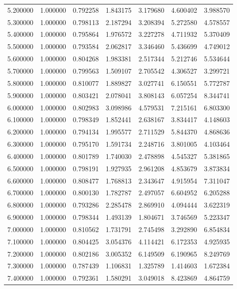 \begin{table}
\begin{tabular}{rrrrrrr}
5.200000 & 1.000000 & 0.792258 & 1.843175 & 3.179680 & 4.600402 & 3.988570 \\
5.300000 & 1.000000 & 0.798113 & 2.187294 & 3.208394 & 5.272580 & 4.578557 \\
5.400000 & 1.000000 & 0.795864 & 1.976572 & 3.227278 & 4.711932 & 5.370409 \\
5.500000 & 1.000000 & 0.793584 & 2.062817 & 3.346460 & 5.436699 & 4.749012 \\
5.600000 & 1.000000 & 0.804268 & 1.983381 & 2.517344 & 5.212746 & 5.534644 \\
5.700000 & 1.000000 & 0.799563 & 1.509107 & 2.705542 & 4.306527 & 3.299721 \\
5.800000 & 1.000000 & 0.810077 & 1.889827 & 3.027741 & 6.150551 & 5.772787 \\
5.900000 & 1.000000 & 0.803421 & 2.078041 & 3.808143 & 6.057254 & 8.344741 \\
6.000000 & 1.000000 & 0.802983 & 3.098986 & 4.579531 & 7.215161 & 6.803300 \\
6.100000 & 1.000000 & 0.798349 & 1.852441 & 2.638167 & 3.834417 & 4.148603 \\
6.200000 & 1.000000 & 0.794134 & 1.995577 & 2.711529 & 5.844370 & 4.868636 \\
6.300000 & 1.000000 & 0.795170 & 1.591734 & 2.248716 & 3.801005 & 4.103464 \\
6.400000 & 1.000000 & 0.801789 & 1.740030 & 2.478898 & 4.545327 & 5.381865 \\
6.500000 & 1.000000 & 0.798191 & 1.927935 & 2.961208 & 4.853679 & 3.873834 \\
6.600000 & 1.000000 & 0.808477 & 1.768813 & 2.343647 & 4.915954 & 7.311047 \\
6.700000 & 1.000000 & 0.800130 & 1.782787 & 2.497057 & 6.604952 & 6.205288 \\
6.800000 & 1.000000 & 0.793286 & 2.285478 & 2.869910 & 4.094444 & 3.622319 \\
6.900000 & 1.000000 & 0.798344 & 1.493139 & 1.804671 & 3.746569 & 5.223347 \\
7.000000 & 1.000000 & 0.810562 & 1.731791 & 2.745498 & 3.292890 & 6.854834 \\
7.100000 & 1.000000 & 0.804425 & 3.054376 & 4.114421 & 6.172353 & 4.925935 \\
7.200000 & 1.000000 & 0.802186 & 3.005352 & 6.149509 & 6.190965 & 8.249769 \\
7.300000 & 1.000000 & 0.787439 & 1.106831 & 1.325789 & 1.414603 & 1.672384 \\
7.400000 & 1.000000 & 0.792361 & 1.580291 & 3.049018 & 8.423869 & 4.864759 \\

\end{tabular}
\end{table}
